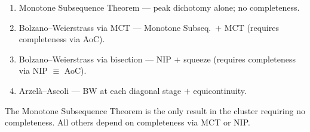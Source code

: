 \begin{remark}
\begin{enumerate}
  \item Monotone Subsequence Theorem — peak dichotomy alone; no completeness.
  \item Bolzano--Weierstrass via MCT — Monotone Subseq.\ $+$ MCT (requires
        completeness via AoC).
  \item Bolzano--Weierstrass via bisection — NIP $+$ squeeze (requires
        completeness via NIP $\equiv$ AoC).
  \item Arzel\`a--Ascoli — BW at each diagonal stage $+$ equicontinuity.
\end{enumerate}
The Monotone Subsequence Theorem is the only result in the cluster requiring
no completeness. All others depend on completeness via MCT or NIP.
\end{remark}
